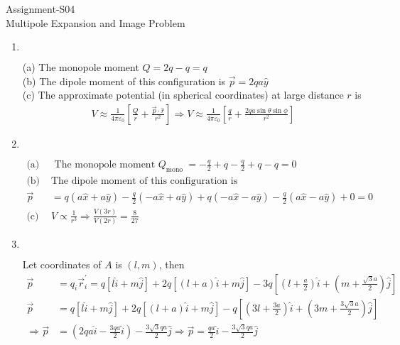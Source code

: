 \begin{abox}
	Assignment-S04\\
	\vspace{0.5cm}
	Multipole Expansion and Image Problem
	\end{abox}
\begin{enumerate}
	\item $\left. \right. $
	\begin{answer}
			(a) The monopole moment $Q=2 q-q=q$\\
		(b) The dipole moment of this configuration is $\vec{p}=2 q a \hat{y}$\\
		(c) The approximate potential (in spherical coordinates) at large distance $r$ is
		\begin{align*}
		V \approx \frac{1}{4 \pi \varepsilon_{0}}\left[\frac{Q}{r}+\frac{\vec{p} \cdot \hat{r}}{r^{2}}\right] \Rightarrow V \approx \frac{1}{4 \pi \varepsilon_{0}}\left[\frac{q}{r}+\frac{2 q a \sin \theta \sin \phi}{r^{2}}\right]
		\end{align*}
	\end{answer}
	\item $\left. \right. $
	 \begin{answer}
	 	\begin{align*}
	  \text{(a)}&\text{ The monopole moment }Q_{\text {mono }}=-\frac{q}{2}+q-\frac{q}{2}+q-q=0\\
	 	\text{(b) }&\text{The dipole moment}\text{ of this configuration is}\\
	 	\vec{p}&=q(a \hat{x}+a \hat{y})-\frac{q}{2}(-a \hat{x}+a \hat{y})+q(-a \hat{x}-a \hat{y})-\frac{q}{2}(a \hat{x}-a \hat{y})+0=0\\
	 	\text{(c) }&V \propto \frac{1}{r^{3}} \Rightarrow \frac{V(3 r)}{V(2 r)}=\frac{8}{27}
	 	\end{align*}
	 \end{answer}
	\item $\left. \right. $
	\begin{answer}
		 Let coordinates of $A$ is $(l, m)$, then
		\begin{align*}
		\vec{p}&=q_{i} \vec{r}_{i}^{\prime}=q[l \hat{i}+m \hat{j}]+2 q[(l+a) \hat{i}+m \hat{j}]-3 q\left[\left(l+\frac{a}{2}\right) \hat{i}+\left(m+\frac{\sqrt{3} a}{2}\right) \hat{j}\right] \\
		\vec{p}&=q[l \hat{i}+m \hat{j}]+2 q[(l+a) \hat{i}+m \hat{j}]-q\left[\left(3 l+\frac{3 a}{2}\right) \hat{i}+\left(3 m+\frac{3 \sqrt{3} a}{2}\right) \hat{j}\right] \\
		\Rightarrow \vec{p}&=\left(2 q a \hat{i}-\frac{3 q a}{2} \hat{i}\right)-\frac{3 \sqrt{3} q a}{2} \hat{j} \Rightarrow \vec{p}=\frac{q a}{2} \hat{i}-\frac{3 \sqrt{3} q a}{2} \hat{j}

\end{align*}
\end{answer}
\end{enumerate}

